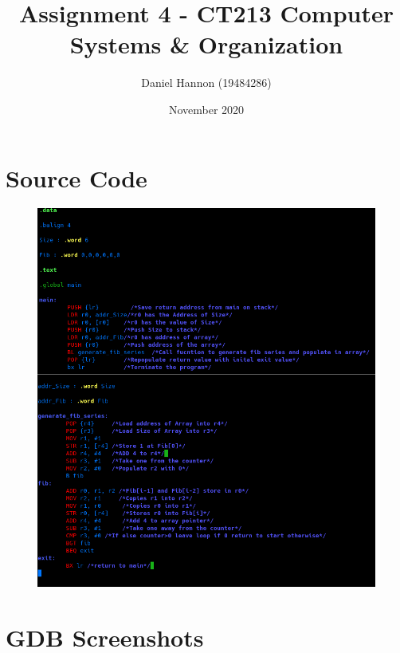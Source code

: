 \documentclass{article}
\title{Assignment 4 - CT213 Computer Systems \& Organization}
\author{Daniel Hannon (19484286)}
\date{November 2020}
\begin{document}
	\maketitle
	\section{Source Code}
	\begin{figure}[h!]
		\centering
		\includegraphics[width=\textwidth]{code.png}
	\end{figure}
	\newpage
	\section{GDB Screenshots}
\end{document}
